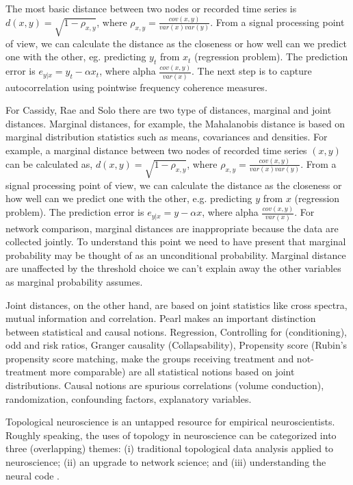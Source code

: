 \documentclass[onecollarge,runningheads]{svjour2}
\begin{document}
The most basic distance between two nodes or recorded time series is $d(x,y) = \sqrt{1 - \rho_{x,y}}$, where $\rho_{x,y}=\frac{cov(x,y)}{var(x)var(y)}$.  From a signal processing point of view, we can calculate the distance as the closeness or how well can we predict one with the other, eg. predicting $y_t$ from $x_t$ (regression problem). The prediction error is $e_{y|x} = y_t - \alpha x_t$, where alpha $\frac{cov(x,y)}{var(x)}$.
The next step is to capture autocorrelation using pointwise frequency coherence measures.

For Cassidy, Rae and Solo there are two type of distances, marginal and joint distances. Marginal distances, for example, the Mahalanobis distance is based on marginal distribution statistics such as means, covariances and densities. For example, a marginal distance between two nodes of recorded time series $(x,y)$ can be calculated as, $d(x,y) = \sqrt{1 - \rho_{x,y}}$, where $\rho_{x,y}=\frac{cov(x,y)}{var(x)var(y)}$. 
From a signal processing point of view, we can calculate the distance as the closeness or how well can we predict one with the other, e.g. predicting $y$ from $x$ (regression problem). The prediction error is $e_{y|x} = y - \alpha x$, where alpha $\frac{cov(x,y)}{var(x)}$. For network comparison, marginal distances are inappropriate because the data are collected jointly. To understand this point we need to have present that marginal probability may be thought of as an unconditional probability. 
Marginal distance are unaffected by the threshold choice we can't explain away the other variables as marginal probability assumes.

Joint distances, on the other hand, are based on joint statistics like cross spectra, mutual information and correlation. Pearl makes an important distinction between statistical and causal notions. Regression, Controlling for (conditioning), odd and risk ratios, Granger causality (Collapsability), Propensity score (Rubin's propensity score matching, make the groups receiving treatment and not-treatment more comparable) are all statistical notions based on joint distributions. 
Causal notions are spurious correlations (volume conduction), randomization, confounding factors, explanatory variables.


Topological neuroscience is an untapped resource for empirical neuroscientists.
Roughly speaking, the uses of topology in neuroscience can be categorized into three (overlapping) themes: (i) traditional topological data analysis applied to neuroscience; (ii) an upgrade to network science; and (iii) understanding the neural code \cite{curto2016can}.
\end{document}

